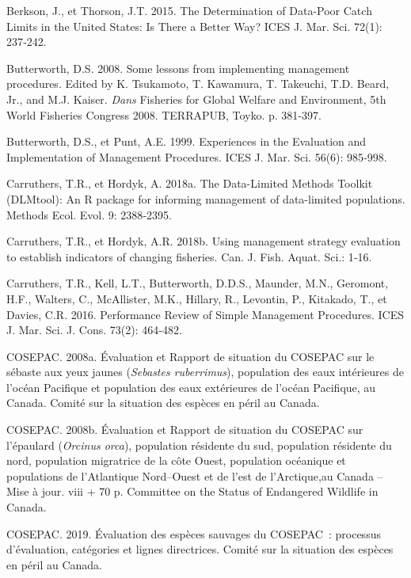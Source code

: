 \documentclass[french,11pt]{book}
\begin{document}
\leavevmode\hypertarget{ref-berkson2015}{}%
Berkson, J., et Thorson, J.T. 2015. The Determination of Data-Poor Catch Limits in the United States: Is There a Better Way? ICES J. Mar. Sci. 72(1): 237‑242.

\leavevmode\hypertarget{ref-butterworth2008}{}%
Butterworth, D.S. 2008. Some lessons from implementing management procedures. Edited by K. Tsukamoto, T. Kawamura, T. Takeuchi, T.D. Beard, Jr., and M.J. Kaiser. \emph{Dans} Fisheries for Global Welfare and Environment, 5th World Fisheries Congress 2008. TERRAPUB, Toyko. p. 381‑397.

\leavevmode\hypertarget{ref-butterworth1999}{}%
Butterworth, D.S., et Punt, A.E. 1999. Experiences in the Evaluation and Implementation of Management Procedures. ICES J. Mar. Sci. 56(6): 985‑998.

\leavevmode\hypertarget{ref-carruthers2018}{}%
Carruthers, T.R., et Hordyk, A. 2018a. The Data-Limited Methods Toolkit (DLMtool): An R package for informing management of data-limited populations. Methods Ecol. Evol. 9: 2388‑2395.

\leavevmode\hypertarget{ref-carruthers_hordyk_2018}{}%
Carruthers, T.R., et Hordyk, A.R. 2018b. Using management strategy evaluation to establish indicators of changing fisheries. Can. J. Fish. Aquat. Sci.: 1‑16.

\leavevmode\hypertarget{ref-carruthers2016}{}%
Carruthers, T.R., Kell, L.T., Butterworth, D.D.S., Maunder, M.N., Geromont, H.F., Walters, C., McAllister, M.K., Hillary, R., Levontin, P., Kitakado, T., et Davies, C.R. 2016. Performance Review of Simple Management Procedures. ICES J. Mar. Sci. J. Cons. 73(2): 464‑482.

\leavevmode\hypertarget{ref-cosewic2008}{}%
COSEPAC. 2008a. Évaluation et Rapport de situation du COSEPAC sur le sébaste aux yeux jaunes (\emph{Sebastes ruberrimus}), population des eaux intérieures de l'océan Pacifique et population des eaux extérieures de l'océan Pacifique, au Canada. Comité sur la situation des espèces en péril au Canada.

\leavevmode\hypertarget{ref-cosewic2008b}{}%
COSEPAC. 2008b. Évaluation et Rapport de situation du COSEPAC sur l'épaulard (\emph{Orcinus orca}), population résidente du sud, population résidente du nord, population migratrice de la côte Ouest, population océanique et populations de l'Atlantique Nord--Ouest et de l'est de l'Arctique,au Canada -- Mise à jour. viii + 70 p. Committee on the Status of Endangered Wildlife in Canada.

\leavevmode\hypertarget{ref-cosewic2015}{}%
COSEPAC. 2019. Évaluation des espèces sauvages du COSEPAC~: processus d'évaluation, catégories et lignes directrices. Comité sur la situation des espèces en péril au Canada.
\end{document}
